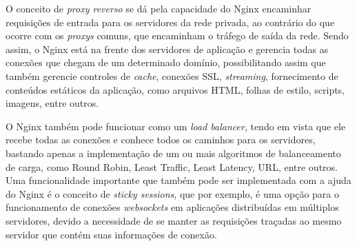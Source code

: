 O conceito de \textit{proxy reverso} se dá pela capacidade do Nginx encaminhar requisições de entrada para os servidores da rede privada, ao contrário do que ocorre com os \textit{proxys} comuns, que encaminham o tráfego de saída da rede. Sendo assim, o Nginx está na frente dos servidores de aplicação e gerencia todas as conexões que chegam de um determinado domínio, possibilitando assim que também gerencie controles de \textit{cache}, conexões SSL, \textit{streaming}, fornecimento de conteúdos estáticos da aplicação, como arquivos HTML, folhas de estilo, scripts, imagens, entre outros.

O Nginx também pode funcionar como um \textit{load balancer}, tendo em vista que ele recebe todas as conexões e conhece todos os caminhos para os servidores, bastando apenas a implementação de um ou mais algoritmos de balanceamento de carga, como Round Robin, Least Traffic, Least Latency, URL, entre outros. Uma funcionalidade importante que também pode ser implementada com a ajuda do Nginx é o conceito de \textit{sticky sessions}, que por exemplo, é uma opção para o funcionamento de conexões \textit{websockets} em aplicações distribuídas em múltiplos servidores, devido a necessidade de se manter as requisições traçadas ao mesmo servidor que contém suas informações de conexão.